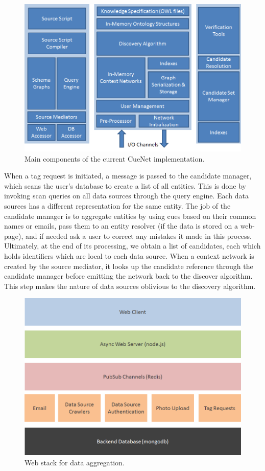 \begin{figure}[t]
\centering
\includegraphics[width=\textwidth]{media/chapter4/detailed-concept-arch.png}
\caption{Main components of the current CueNet implementation.}
\label{fig:d-concept-arch}
\end{figure}

When a tag request is initiated, a message is passed to the candidate manager, which scans the user's database to create a list of all entities. This is done by invoking scan queries on all data sources through the query engine. Each data sources has a different representation for the same entity. The job of the candidate manager is to aggregate entities by using cues based on their common names or emails, pass them to an entity resolver (if the data is stored on a web-page), and if needed ask a user to correct any mistakes it made in this process. Ultimately, at the end of its processing, we obtain a list of candidates, each which holds identifiers which are local to each data source. When a context network is created by the source mediator, it looks up the candidate reference through the candidate manager before emitting the network back to the discover algorithm. This step makes the nature of data sources oblivious to the discovery algorithm.

\begin{figure}[h]
\centering
\includegraphics[width=\textwidth]{media/chapter4/web-stack.png}
\caption{Web stack for data aggregation.}
\label{fig:web-stack}
\end{figure}

